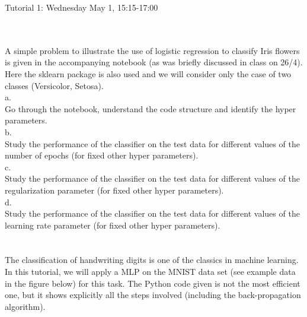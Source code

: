 \documentclass[10pt]{article}
\begin{document}
 
\medskip
\centerline{{\LARGE Tutorial 1: Wednesday May 1,   15:15-17:00}}
\vspace{0.5cm}


 \\

 \\

A simple problem to illustrate the use of logistic regression to 
classify Iris flowers is given in the accompanying notebook 
(as was briefly discussed in class on 26/4). Here the sklearn 
package is also used and we will consider only the case of 
two classes (Versicolor, Setosa). \\

\noindent a.   \\
\noindent   Go through the notebook, understand the code 
structure  and identify the hyper parameters.   \\

\noindent b.   \\
\noindent  Study the performance of the classifier on the 
test data for different values of the number of epochs (for
fixed other hyper parameters). \\

\noindent c.   \\
\noindent  Study the performance of the classifier on the 
test data for different values of the regularization
parameter  (for fixed other hyper parameters). \\

\noindent d.   \\
\noindent  Study the performance of the classifier on the 
test data for different values of the learning rate 
parameter  (for fixed other hyper parameters). \\


 \\

 \\

The classification of handwriting digits is one of the classics 
in machine learning. In this tutorial, we will apply a MLP 
on the MNIST data set (see example data in the figure below) 
for this task. The Python  code given is not the most efficient 
one, but it shows explicitly all the  steps involved (including 
the back-propagation algorithm). \\
%
\begin{figure}[htpb]
 \begin{minipage}[t]{\linewidth}
  \centering{} 
 \end{minipage} \hfill
\label{f:F1} 
\end{figure}
%
\end{document}
